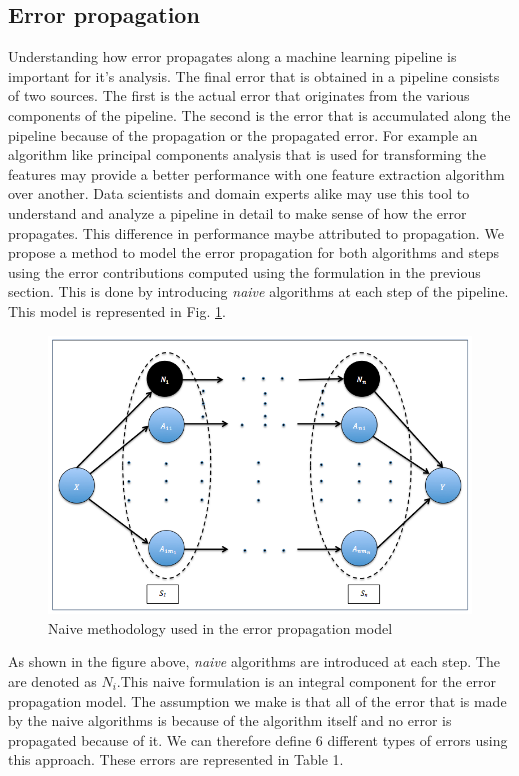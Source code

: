 \subsection{Error propagation}
\label{subsec2}
Understanding how error propagates along a machine learning pipeline is important for it's analysis. The final error that is obtained in a pipeline consists of two sources. The first is the actual error that originates from the various components of the pipeline. The second is the error that is accumulated along the pipeline because of the propagation or the propagated error. For example an algorithm like principal components analysis that is used for transforming the features may provide a better performance with one feature extraction algorithm over another. Data scientists and domain experts alike may use this tool to understand and analyze a pipeline in detail to make sense of how the error propagates. This difference in performance maybe attributed to propagation. We propose a method to model the error propagation for both algorithms and steps using the error contributions computed using the formulation in the previous section. This is done by introducing \textit{naive} algorithms at each step of the pipeline. This model is represented in Fig. \ref{fig:naive}. 
\begin{figure}[H]
\label{naive_pipeline}
    \centering
    \includegraphics[scale=0.5]{img/EP/generalized_naive}
    \caption{Naive methodology used in the error propagation model}
    \label{fig:naive}
\end{figure}
As shown in the figure above, \textit{naive} algorithms are introduced at each step. The are denoted as $N_i$.This naive formulation is an integral component for the error propagation model. The assumption we make is that all of the error that is made by the naive algorithms is because of the algorithm itself and no error is propagated because of it. We can therefore define 6 different types of errors using this approach. These errors are represented in Table 1.


